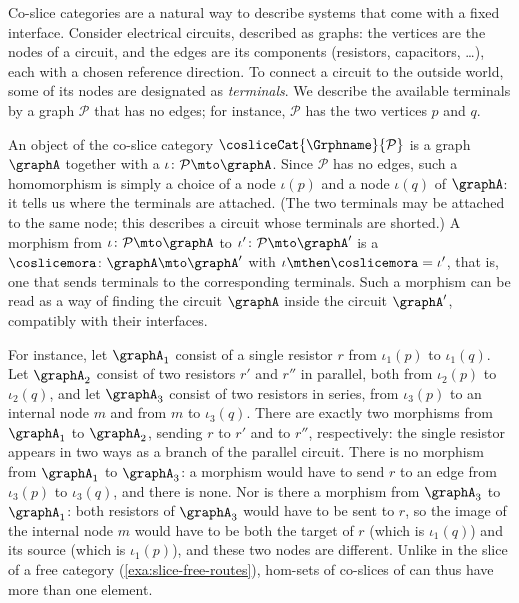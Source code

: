 \begin{example}
    \label{exa:coslice-open-circuits}
    Co-slice categories are a natural way to describe systems that come with a fixed interface.
    Consider electrical circuits, described as graphs: the vertices are the nodes of a circuit, and the edges are its components (resistors, capacitors, \dots), each with a chosen reference direction.
    To connect a circuit to the outside world, some of its nodes are designated as \emph{terminals}.
    We describe the available terminals by a graph $\mathcal{P}$ that has no edges; for instance, $\mathcal{P}$ has the two vertices $p$ and $q$.

    An object of the co-slice category $\cosliceCat{\Grphname}{\mathcal{P}}$ is a graph $\graphA$ together with a  $\iota \colon \mathcal{P} \mto \graphA$.
    Since $\mathcal{P}$ has no edges, such a homomorphism is simply a choice of a node $\iota(p)$ and a node $\iota(q)$ of $\graphA$: it tells us where the terminals are attached.
    (The two terminals may be attached to the same node; this describes a circuit whose terminals are shorted.)
    A morphism from $\iota \colon \mathcal{P} \mto \graphA$ to $\iota' \colon \mathcal{P} \mto \graphA'$ is a  $\coslicemora \colon \graphA \mto \graphA'$ with $\iota \mthen \coslicemora = \iota'$, that is, one that sends terminals to the corresponding terminals.
    Such a morphism can be read as a way of finding the circuit $\graphA$ inside the circuit $\graphA'$, compatibly with their interfaces.

    For instance, let $\graphA_1$ consist of a single resistor $r$ from $\iota_1(p)$ to $\iota_1(q)$.
    Let $\graphA_2$ consist of two resistors $r'$ and $r''$ in parallel, both from $\iota_2(p)$ to $\iota_2(q)$, and let $\graphA_3$ consist of two resistors in series, from $\iota_3(p)$ to an internal node $m$ and from $m$ to $\iota_3(q)$.
    There are exactly two morphisms from $\graphA_1$ to $\graphA_2$, sending $r$ to $r'$ and to $r''$, respectively: the single resistor appears in two ways as a branch of the parallel circuit.
    There is no morphism from $\graphA_1$ to $\graphA_3$: a morphism would have to send $r$ to an edge from $\iota_3(p)$ to $\iota_3(q)$, and there is none.
    Nor is there a morphism from $\graphA_3$ to $\graphA_1$: both resistors of $\graphA_3$ would have to be sent to $r$, so the image of the internal node $m$ would have to be both the target of $r$ (which is $\iota_1(q)$) and its source (which is $\iota_1(p)$), and these two nodes are different.
    Unlike in the slice of a free category (\cref{exa:slice-free-routes}), hom-sets of co-slices of \Grph can thus have more than one element.
\end{example}


